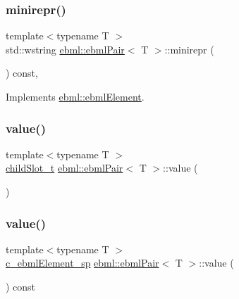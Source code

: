 \mbox{\label{classebml_1_1ebmlPair_a88a68eed87260a46f40371f14279da4e}} 
\subsubsection{\texorpdfstring{minirepr()}{minirepr()}}
{\footnotesize\ttfamily template$<$typename T $>$ \\
std\+::wstring \mbox{\hyperlink{classebml_1_1ebmlPair}{ebml\+::ebml\+Pair}}$<$ T $>$\+::minirepr (\begin{DoxyParamCaption}{ }\end{DoxyParamCaption}) const\hspace{0.3cm}{\ttfamily [override]}, {\ttfamily [virtual]}}



Implements \mbox{\hyperlink{classebml_1_1ebmlElement_a7852173aeef78bd843939ae5a82f1d1c}{ebml\+::ebml\+Element}}.

\mbox{\label{classebml_1_1ebmlPair_a4808e061fa6ea4b11a7e9490c037bba5}} 
\subsubsection{\texorpdfstring{value()}{value()}\hspace{0.1cm}{\footnotesize\ttfamily [1/2]}}
{\footnotesize\ttfamily template$<$typename T $>$ \\
\mbox{\hyperlink{classebml_1_1childSlot__t}{child\+Slot\+\_\+t}} \mbox{\hyperlink{classebml_1_1ebmlPair}{ebml\+::ebml\+Pair}}$<$ T $>$\+::value (\begin{DoxyParamCaption}{ }\end{DoxyParamCaption})}

\mbox{\label{classebml_1_1ebmlPair_abfb141bc1df5ab8c20f0d6d931accb67}} 
\subsubsection{\texorpdfstring{value()}{value()}\hspace{0.1cm}{\footnotesize\ttfamily [2/2]}}
{\footnotesize\ttfamily template$<$typename T $>$ \\
\mbox{\hyperlink{namespaceebml_a2deef4e8071531b32e3533f1bf978917}{c\+\_\+ebml\+Element\+\_\+sp}} \mbox{\hyperlink{classebml_1_1ebmlPair}{ebml\+::ebml\+Pair}}$<$ T $>$\+::value (\begin{DoxyParamCaption}{ }\end{DoxyParamCaption}) const}



